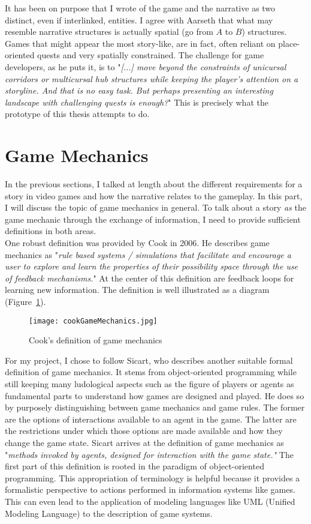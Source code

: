 It has been on purpose that I wrote of the game and the narrative as two distinct, even if interlinked, entities. I agree with Aarseth that what may resemble narrative structures is actually spatial (go from $A$ to $B$) structures. Games that might appear the most story-like, are in fact, often reliant on place-oriented quests and very spatially constrained. The challenge for game developers, as he puts it, is to "\textit{[...] move beyond the constraints of unicursal corridors or multicursal hub structures while keeping the player’s attention on a storyline. And that is no easy task. But perhaps presenting an interesting landscape with challenging quests is enough?}" This is precisely what the prototype of this thesis attempts to do.~\cite{Aarseth2005}
\section{Game Mechanics}
In the previous sections, I talked at length about the different requirements for a story in video games and how the narrative relates to the gameplay. In this part, I will discuss the topic of game mechanics in general. To talk about a story \textit{as} the game mechanic through the exchange of information, I need to provide sufficient definitions in both areas.\\
One robust definition was provided by Cook in 2006. He describes game mechanics as "\textit{rule based systems / simulations that facilitate and encourage a user to explore and learn the properties of their possibility space through the use of feedback mechanisms.}" At the center of this definition are feedback loops for learning new information. The definition is well illustrated as a diagram (Figure~\ref{fig:cookGameMechanics}).~\cite{Cook2006}
\begin{figure}
	\centering
	\texttt{[image: cookGameMechanics.jpg]}
	\caption{Cook's definition of game mechanics~\cite{Cook2006}}
	\label{fig:cookGameMechanics}
\end{figure}
For my project, I chose to follow Sicart, who describes another suitable formal definition of game mechanics. It stems from object-oriented programming while still keeping many ludological aspects such as the figure of players or agents as fundamental parts to understand how games are designed and played. He does so by purposely distinguishing between game mechanics and game rules. The former are the options of interactions available to an agent in the game. The latter are the restrictions under which those options are made available and how they change the game state. Sicart arrives at the definition of game mechanics as "\textit{methods invoked by agents, designed for interaction with the game state."} The first part of this definition is rooted in the paradigm of object-oriented programming. This appropriation of terminology is helpful because it provides a formalistic perspective to actions performed in information systems like games. This can even lead to the application of modeling languages like UML (Unified Modeling Language) to the description of game systems.~\cite{Sicart2008}\\
